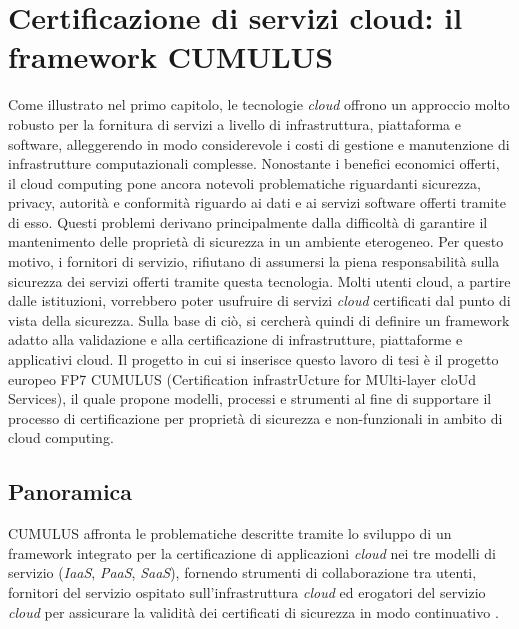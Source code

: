 \documentclass[../main.tex]{subfiles}
\begin{document}
\chapter{Certificazione di servizi cloud: il framework CUMULUS}

Come illustrato nel primo capitolo, le tecnologie \textit{cloud} offrono un approccio molto robusto per la fornitura di servizi a livello di infrastruttura, piattaforma e software, alleggerendo in modo considerevole i costi di gestione e manutenzione di infrastrutture computazionali complesse.
Nonostante i benefici economici offerti, il cloud computing pone ancora notevoli problematiche riguardanti sicurezza, privacy, autorità e conformità riguardo ai dati e ai servizi software offerti tramite di esso.
Questi problemi derivano principalmente dalla difficoltà di garantire il mantenimento delle proprietà di sicurezza in un ambiente eterogeneo. Per questo motivo, i fornitori di servizio, rifiutano di assumersi la piena responsabilità sulla sicurezza dei servizi offerti tramite questa tecnologia.
Molti utenti cloud, a partire dalle istituzioni, vorrebbero poter usufruire di servizi \textit{cloud} certificati dal punto di vista della sicurezza.
Sulla base di ciò, si cercherà quindi di definire un framework adatto alla validazione e alla certificazione di infrastrutture, piattaforme e applicativi cloud.
Il progetto in cui si inserisce questo lavoro di tesi è il progetto europeo FP7 CUMULUS (Certification infrastrUcture for MUlti-layer cloUd Services), il quale propone modelli, processi e strumenti al fine di supportare il processo di certificazione per proprietà di sicurezza e non-funzionali in ambito di cloud computing.

\section{Panoramica}
CUMULUS affronta le problematiche descritte tramite lo sviluppo di un framework integrato per la certificazione di applicazioni \textit{cloud} nei tre modelli di servizio (\textit{IaaS}, \textit{PaaS}, \textit{SaaS}), fornendo strumenti di collaborazione tra utenti, fornitori del servizio ospitato sull'infrastruttura \textit{cloud} ed erogatori del servizio \textit{cloud} per assicurare la validità dei certificati di sicurezza in modo continuativo \cite{SpanoudakisDamiani}.
\end{document}
